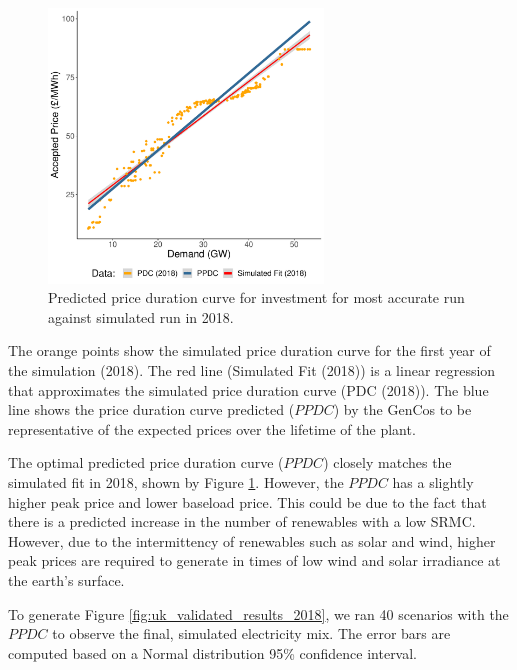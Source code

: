 \begin{figure}
	\centering
	\includegraphics[width=0.65\textwidth]{Chapter4/figures/e-Energy-2020/results/best_run_price_dur_curve.pdf}
	\caption{Predicted price duration curve for investment for most accurate run against simulated run in 2018.}
	\label{fig:best_price_curve}
\end{figure}

The orange points show the simulated price duration curve for the first year of the simulation (2018). The red line (Simulated Fit (2018)) is a linear regression that approximates the simulated price duration curve (PDC (2018)). The blue line shows the price duration curve predicted ($PPDC$) by the GenCos to be representative of the expected prices over the lifetime of the plant.


The optimal predicted price duration curve ($PPDC$) closely matches the simulated fit in 2018, shown by Figure \ref{fig:best_price_curve}. However, the $PPDC$ has a slightly higher peak price and lower baseload price. This could be due to the fact that there is a predicted increase in the number of renewables with a low SRMC. However, due to the intermittency of renewables such as solar and wind, higher peak prices are required to generate in times of low wind and solar irradiance at the earth's surface.






To generate Figure \ref{fig:uk_validated_results_2018}, we ran 40 scenarios with the $PPDC$ to observe the final, simulated electricity mix. The error bars are computed based on a Normal distribution 95\% confidence interval.

